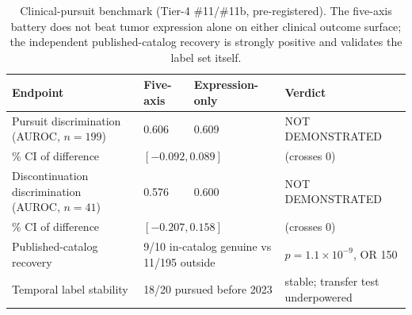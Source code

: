 \documentclass[11pt]{article}
\begin{document}
\begin{table}[t]\centering\footnotesize
\caption{Clinical-pursuit benchmark (Tier-4 \#11/\#11b, pre-registered). The
five-axis battery does not beat tumor expression alone on either clinical
outcome surface; the independent published-catalog recovery is strongly
positive and validates the label set itself.}\label{tab:clinbench}
\begin{tabular}{llll}
\toprule
Endpoint & Five-axis & Expression-only & Verdict \\
\midrule
Pursuit discrimination (AUROC, $n{=}199$) & 0.606 & 0.609 & NOT DEMONSTRATED \\
\quad 95\% CI of difference & \multicolumn{2}{l}{$[-0.092, 0.089]$} & (crosses 0) \\
Discontinuation discrimination (AUROC, $n{=}41$) & 0.576 & 0.600 & NOT DEMONSTRATED \\
\quad 95\% CI of difference & \multicolumn{2}{l}{$[-0.207, 0.158]$} & (crosses 0) \\
Published-catalog recovery & \multicolumn{2}{l}{9/10 in-catalog genuine vs 11/195 outside} & $p{=}1.1{\times}10^{-9}$, OR 150 \\
Temporal label stability & \multicolumn{2}{l}{18/20 pursued before 2023} & stable; transfer test underpowered \\
\bottomrule
\end{tabular}
\end{table}
\end{document}
